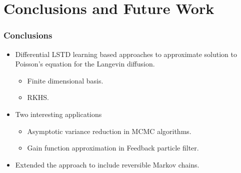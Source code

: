 \documentclass[xcolor=dvipsnames, subsection=false]{beamer}
\begin{document}
\section{Conclusions and Future Work}
\begin{frame}
\frametitle{Conclusions}
\begin{itemize}
	\item Differential LSTD learning based approaches to approximate solution to Poisson's equation for the Langevin diffusion.\\[-0.1cm]
	 \begin{itemize}
	 	\item Finite dimensional basis.
	 	\item RKHS.
	 \end{itemize}
	\item Two interesting applications
	\begin{itemize}
		\item Asymptotic variance reduction in MCMC algorithms.
		\item Gain function approximation in Feedback particle filter.
	\end{itemize}
	\item Extended the approach to include reversible Markov chains.
\end{itemize}
\end{frame}

%	
%	
%	
\end{document}
